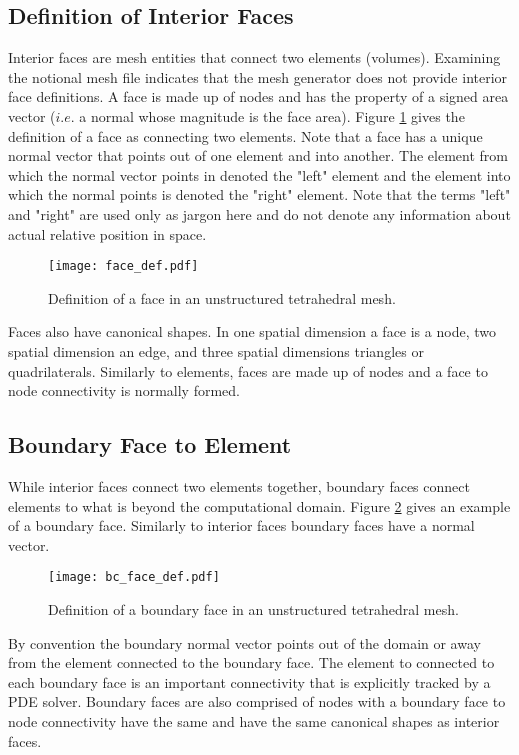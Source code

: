 \documentclass[letterpaper]{article}
\newcommand{\figref}[1]{Figure \ref{#1}}                %
\newcommand{\figwidth}{.48\textwidth}
\newcommand{\lfigwidth}{.68\textwidth} %
\begin{document}
 \subsection{Definition of Interior Faces}
 Interior faces are mesh entities that connect two elements (volumes).  Examining the notional mesh file indicates that the mesh generator does not provide interior face definitions.  A face is made up of nodes and has the property of a signed area vector ($i.e.$ a normal whose magnitude is the face area).  \figref{fig:face_def} gives the definition of a face as connecting two elements.  Note that a face has a unique normal vector that points out of one element and into another.  The element from which the normal vector points in denoted the "left" element and the element into which the normal points is denoted the "right" element.  Note that the terms "left" and "right" are used only as jargon here and do not denote any information about actual relative position in space.  
 \begin{figure}[h!]
\centering
\texttt{[image: face\_def.pdf]}
\caption{Definition of a face in an unstructured tetrahedral mesh.}
\label{fig:face_def}
\end{figure}

Faces also have canonical shapes.  In one spatial dimension a face is a node, two spatial dimension an edge, and three spatial dimensions triangles or quadrilaterals.  Similarly to elements, faces are made up of nodes and a face to node connectivity is normally formed.    
\subsection{Boundary Face to Element}
While interior faces connect two elements together, boundary faces connect elements to what is beyond the computational domain.  \figref{fig:bc_face_def} gives an example of a boundary face.  Similarly to interior faces boundary faces have a normal vector.  
 \begin{figure}[h!]
\centering
\texttt{[image: bc\_face\_def.pdf]}
\caption{Definition of a boundary face in an unstructured tetrahedral mesh.}
\label{fig:bc_face_def}
\end{figure}

By convention the boundary normal vector points out of the domain or away from the element connected to the boundary face.  The element to connected to each boundary face is an important connectivity that is explicitly tracked by a PDE solver.   Boundary faces are also comprised of nodes with a boundary face to node connectivity have the same and have the same canonical shapes as interior faces.  
\end{document}
